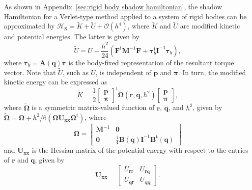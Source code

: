 \documentclass[
journal=jctcce,
layout=twocolumn
]{achemso}
\newcommand{\mt}[1]{\boldsymbol{\mathbf{#1}}}   %
\newcommand{\vt}[1]{\boldsymbol{\mathbf{#1}}}   %
\newcommand{\tr}[1]{#1^\text{t}}                %
\newcommand{\Ham}[1]{{\mathcal H}_\text{#1}}    %
\newcommand{\timestep}{h}
\newcommand{\modified}[1]{\widetilde{#1}}
\begin{document}
As shown in Appendix~\ref{sec:rigid body shadow hamiltonian}, the shadow Hamiltonian for a Verlet-type method applied to a system of rigid bodies can be approximated by $\Ham{S} = \modified K + \modified U + \mathcal{O}(h^4)$, where $\modified K$ and $\modified U$ are modified kinetic and potential energies.
The latter is given by
\begin{equation}
\label{eq:modified potential energy}
\modified U = U - \frac{\timestep^2}{24} \left( \tr{\vt F} {\mt M}^{-1} {\vt F} + \tr{\vt \tau}_b {\mt I}^{-1} {\vt \tau}_b \right),
\end{equation}
where ${\vt \tau}_b = {\mt A}(\vt q) {\vt \tau}$ is the body-fixed representation of the resultant torque vector.
Note that $\modified U$, such as $U$, is independent of $\vt p$ and $\vt \pi$.
In turn, the modified kinetic energy can be expressed as
\begin{equation}
\label{eq:modified kinetic energy}
\modified K = \frac{1}{2} \tr{ \left[\begin{array}{c} \vt p \\ \vt \pi \end{array}\right]} \modified{\mathbf \Omega}(\vt r, \vt q, \timestep^2) \left[\begin{array}{c} \vt p \\ \vt \pi \end{array}\right],
\end{equation}
where $\modified{\mathbf \Omega}$ is a symmetric matrix-valued function of $\vt r$, $\vt q$, and $\timestep^2$, given by $\tilde{\mt \Omega} = {\mt \Omega} + {\timestep^2}/{6} \left( {\mt \Omega} {\mt U}_{\vt x \vt x} \tr{\mt \Omega} \right)$, where
\begin{equation*}
{\mt \Omega} = \left[\begin{array}{cc}
{\mt M}^{-1} & \mt 0 \\
\mt 0 & \frac{1}{4} {\mt B}(\vt q) {\mt I}^{-1} \tr{\mt B}(\vt q)
\end{array}\right]
\end{equation*}
and ${\mt U}_{\vt x \vt x}$ is the Hessian matrix of the potential energy with respect to the entries of $\vt r$ and $\vt q$, given by
\begin{equation*}
{\mt U}_{\vt x \vt x} = \left[\begin{array}{cc}
U_{\vt r \vt r} & U_{\vt r \vt q} \\
U_{\vt q \vt r} & U_{\vt q \vt q}
\end{array}\right].
\end{equation*}
\end{document}
